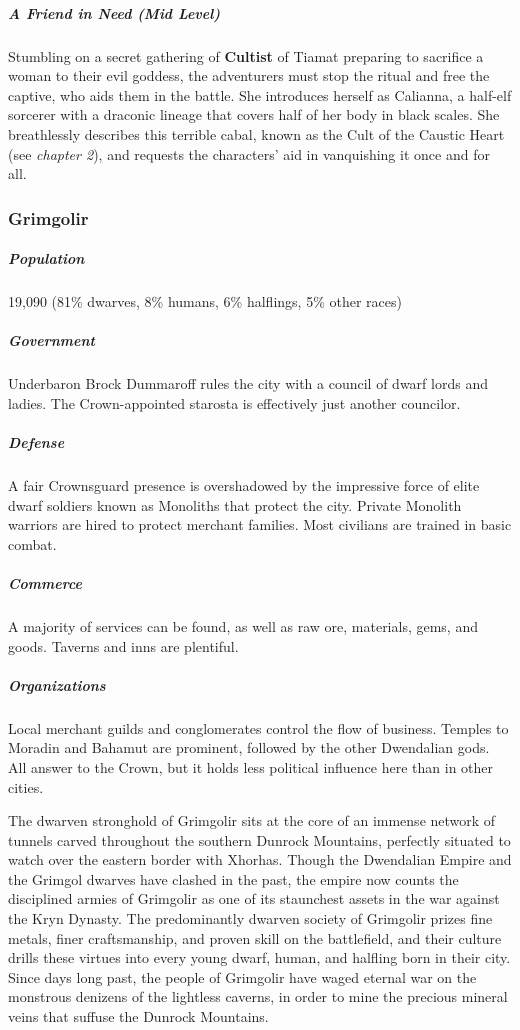 \documentclass[10pt,a4paper,twoside,bg=print,twocolumn,openany,nodeprecatedcode]{dndbook}
\begin{document}
\subparagraph{A Friend in Need (Mid Level)}
Stumbling on a secret gathering of \textbf{Cultist} of Tiamat preparing to sacrifice a woman to their evil goddess, the adventurers must stop the ritual and free the captive, who aids them in the battle. She introduces herself as Calianna, a half-elf sorcerer with a draconic lineage that covers half of her body in black scales. She breathlessly describes this terrible cabal, known as the Cult of the Caustic Heart (see \textit{chapter 2}), and requests the characters' aid in vanquishing it once and for all.

\subsubsection{Grimgolir}
\subparagraph{Population}
19,090 (81\% dwarves, 8\% humans, 6\% halflings, 5\% other races)

\subparagraph{Government}
Underbaron Brock Dummaroff rules the city with a council of dwarf lords and ladies. The Crown-appointed starosta is effectively just another councilor.

\subparagraph{Defense}
A fair Crownsguard presence is overshadowed by the impressive force of elite dwarf soldiers known as Monoliths that protect the city. Private Monolith warriors are hired to protect merchant families. Most civilians are trained in basic combat.

\subparagraph{Commerce}
A majority of services can be found, as well as raw ore, materials, gems, and goods. Taverns and inns are plentiful.

\subparagraph{Organizations}
Local merchant guilds and conglomerates control the flow of business. Temples to Moradin and Bahamut are prominent, followed by the other Dwendalian gods. All answer to the Crown, but it holds less political influence here than in other cities.

The dwarven stronghold of Grimgolir sits at the core of an immense network of tunnels carved throughout the southern Dunrock Mountains, perfectly situated to watch over the eastern border with Xhorhas. Though the Dwendalian Empire and the Grimgol dwarves have clashed in the past, the empire now counts the disciplined armies of Grimgolir as one of its staunchest assets in the war against the Kryn Dynasty. The predominantly dwarven society of Grimgolir prizes fine metals, finer craftsmanship, and proven skill on the battlefield, and their culture drills these virtues into every young dwarf, human, and halfling born in their city. Since days long past, the people of Grimgolir have waged eternal war on the monstrous denizens of the lightless caverns, in order to mine the precious mineral veins that suffuse the Dunrock Mountains.
\end{document}
